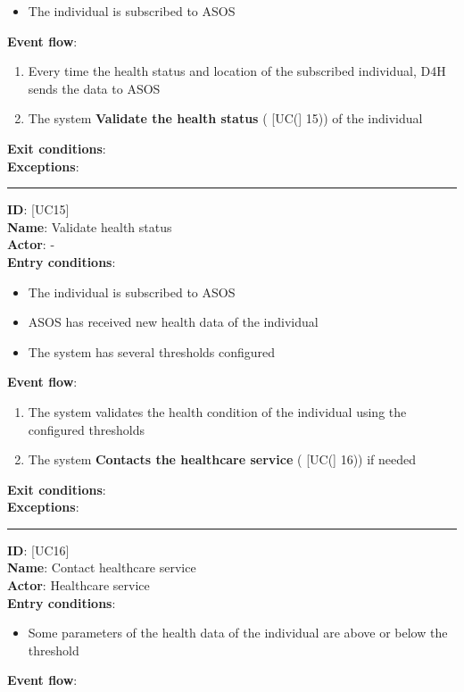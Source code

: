 \documentclass[12pt]{article}
\newcommand\usecase[1]{ [UC#1] }
\begin{document}
\begin{itemize}
\begin{itemize}
    			\item{The individual is subscribed to ASOS}
    		\end{itemize}
  	\textbf{Event flow}:
  		\begin{enumerate}
    			\item{Every time the health status and location of the subscribed individual, D4H sends the data to ASOS}
    			\item{The system \textbf{Validate the health status} (\usecase(15)) of the individual}
  		\end{enumerate}
  	\textbf{Exit conditions}: \\
  	\textbf{Exceptions}: \\
  	\rule{\linewidth}{0.4pt}
  	\textbf{ID}: \usecase{15} \\
  	\textbf{Name}: Validate health status \\
    \textbf{Actor}: - \\
    \textbf{Entry conditions}: 
    		\begin{itemize}
    			\item{The individual is subscribed to ASOS}
    			\item{ASOS has received new health data of the individual}
    			\item{The system has several thresholds configured}
    		\end{itemize}
  	\textbf{Event flow}:
  		\begin{enumerate}
    			\item{The system validates the health condition of the individual using the configured thresholds}
    			\item{The system \textbf{Contacts the healthcare service} (\usecase(16)) if needed}
  		\end{enumerate}
  	\textbf{Exit conditions}: \\
  	\textbf{Exceptions}: \\
  	\rule{\linewidth}{0.4pt}
  	\textbf{ID}: \usecase{16} \\
  	\textbf{Name}: Contact healthcare service \\
    \textbf{Actor}: Healthcare service \\
    \textbf{Entry conditions}: 
    		\begin{itemize}
    			\item{Some parameters of the health data of the individual are above or below the threshold}
    		\end{itemize}
  	\textbf{Event flow}:
  		\begin{enumerate}

\end{enumerate}
\end{itemize}
\end{document}
